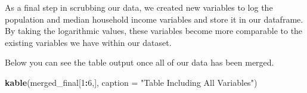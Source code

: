 \documentclass[
]{article}
\newenvironment{Shaded}{\begin{snugshade}}{\end{snugshade}}
\newcommand{\DataTypeTok}[1]{\textcolor[rgb]{0.13,0.29,0.53}{#1}}
\newcommand{\DecValTok}[1]{\textcolor[rgb]{0.00,0.00,0.81}{#1}}
\newcommand{\KeywordTok}[1]{\textcolor[rgb]{0.13,0.29,0.53}{\textbf{#1}}}
\newcommand{\NormalTok}[1]{#1}
\newcommand{\OperatorTok}[1]{\textcolor[rgb]{0.81,0.36,0.00}{\textbf{#1}}}
\newcommand{\StringTok}[1]{\textcolor[rgb]{0.31,0.60,0.02}{#1}}
\begin{document}
As a final step in scrubbing our data, we created new variables to log
the population and median household income variables and store it in our
dataframe. By taking the logarithmic values, these variables become more
comparable to the existing variables we have within our dataset.

Below you can see the table output once all of our data has been merged.

\begin{Shaded}
\begin{Highlighting}[]
\KeywordTok{kable}\NormalTok{(merged_final[}\DecValTok{1}\OperatorTok{:}\DecValTok{6}\NormalTok{,], }\DataTypeTok{caption =} \StringTok{"Table Including All Variables"}\NormalTok{)}
\end{Highlighting}
\end{Shaded}
\end{document}
